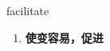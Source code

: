 
\begin{frame}
{\huge facilitate}
\begin{center}
\begin{enumerate}\Large
  \item \textbf{使变容易，促进}
\end{enumerate}
\end{center}
\end{frame}
